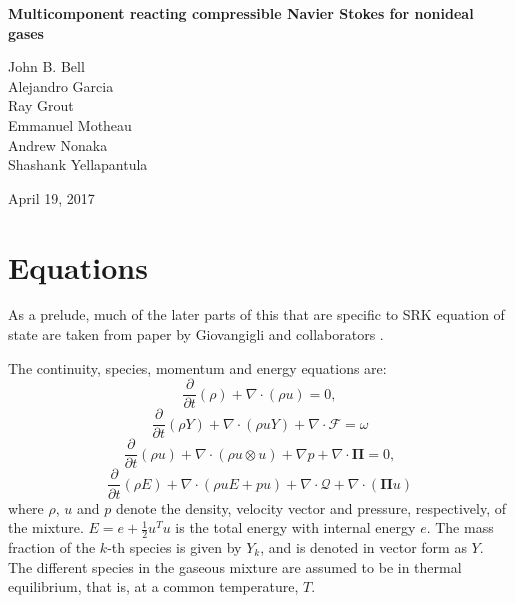 \documentclass[11pt]{article}
\newcommand{\HeatFlux}{\boldsymbol{\mathcal{Q}}}
\newcommand{\SpeciesFlux}{\boldsymbol{\mathcal{F}}}
\newcommand{\StressTensor}{\boldsymbol{\Pi}}
\newcommand{\half}{\frac{1}{2}}
\begin{document}
\begin{center}
{\bf
Multicomponent reacting compressible Navier Stokes for nonideal gases
}

\vspace{\baselineskip}
John B. Bell \\
Alejandro Garcia \\
Ray Grout \\
Emmanuel Motheau \\
Andrew Nonaka \\
Shashank Yellapantula

\vspace{\baselineskip}
April 19, 2017
\end{center}

\section{Equations}

As a prelude, much of the later parts of this that are specific to SRK equation of state are taken from 
paper by Giovangigli and collaborators \cite{giovangigli_CTM:2011,giovangigli:2012}.

The continuity, species, momentum and energy equations are:
\begin{equation}
\frac{\partial }{\partial t} \left( \rho \right)  + { \nabla} \cdot \left( \rho { u} \right) = 0,
\label{eqn:cont}
\end{equation}
\begin{equation}
\frac{\partial }{\partial t} \left( \rho Y \right)  + { \nabla} \cdot \left( \rho { u} Y \right) + { \nabla} \cdot
\SpeciesFlux
=  \omega 
\label{eqn:spec}
\end{equation}
\begin{equation}
\frac{\partial }{\partial t} \left( \rho { u} \right)  + { \nabla} \cdot \left( \rho { u \otimes u } \right) + { \nabla} p + {\nabla} \cdot   \StressTensor = 0,
\label{eqn:mom}
\end{equation}
\begin{equation}
\frac{\partial }{\partial t} \left( \rho E \right)  + { \nabla} \cdot \left( \rho { u} E + p { u}  \right) + { \nabla} \cdot  { \HeatFlux}  + \nabla \cdot (\StressTensor u)
\label{eqn:energy}
\end{equation}
where $\rho$, ${u}$ and $p$ denote the density, velocity vector and pressure, respectively, of the mixture.
$E = e + \half u^T u$ is the total energy with internal energy $e$.
The mass fraction of the $k$-th species is given by $Y_k$, and is denoted in vector form as $Y$.
The different species in the gaseous mixture are assumed to be in thermal equilibrium,
that is, at a common temperature, $T$.
\end{document}
